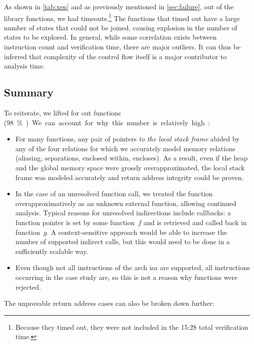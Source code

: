 As shown in \cref{tab:xen} and as previously mentioned in \cref{sec:failure}, out of the  library functions, we had  timeouts.\footnote{%
  Because they timed out, they were not included in the 15:28 total verification time.%
}
The functions that timed out have a large number of states that could not be joined, causing explosion in the number of states to be explored.
In general, while some correlation exists between instruction count and verification time, there are major outliers.
It can thus be inferred that complexity of the control flow itself is a major contributor to analysis time.

\subsection{Summary}\label{hg-results-summary}
To reiterate, we lifted  for  out  functions (\SI{98}\percent).
We can account for why this number is relatively high:
\begin{itemize}
  \item For many functions, any pair of pointers \emph{to the local stack frame} abided by any of the four relations for which we accurately model memory relations (aliasing, separations, enclosed within, encloses).
  As a result, even if the heap and the global memory space were grossly overapproximated, the local stack frame was modeled accurately and return address integrity could be proven.
  \item In the case of an unresolved function call, we treated the function overapproximatively as an unknown external function, allowing continued analysis.
  Typical reasons for unresolved indirections include callbacks: a function pointer is set by some function~$f$ and is retrieved and called back in function~$g$. A context-sensitive approach would be able to increase the number of supported indirect calls, but this would need to be done in a sufficiently scalable way.
  \item Even though not all instructions of the \gls{arch} \ac{isa} are supported, all instructions occurring in the case study are, so this is not a reason why functions were rejected.
\end{itemize}
The unprovable return address cases can also be broken down further:
